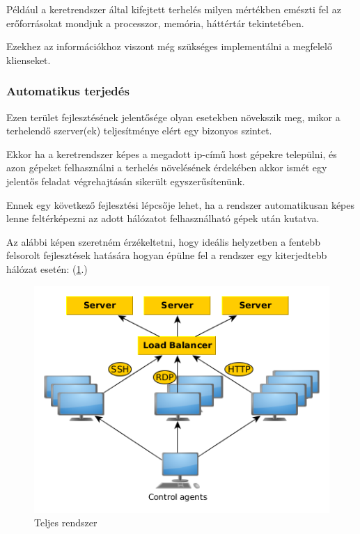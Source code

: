 \documentclass[a4paper,12pt,oneside]{report}
\begin{document}
Például a keretrendszer által kifejtett terhelés milyen mértékben emészti fel az erőforrásokat mondjuk a processzor, memória, háttértár tekintetében.

Ezekhez az információkhoz viszont még szükséges implementálni a megfelelő klienseket.

\subsubsection{Automatikus terjedés}

Ezen terület fejlesztésének jelentősége olyan esetekben növekszik meg, mikor a terhelendő szerver(ek) teljesítménye elért egy bizonyos szintet.

Ekkor ha a keretrendszer képes a megadott ip-című host gépekre települni, és azon gépeket felhasználni a terhelés növelésének érdekében akkor ismét egy jelentős feladat végrehajtásán sikerült egyszerűsítenünk.

Ennek egy következő fejlesztési lépcsője lehet, ha a rendszer automatikusan képes lenne feltérképezni az adott hálózatot felhasználható gépek után kutatva.

Az alábbi képen szeretném érzékeltetni, hogy ideális helyzetben a fentebb felsorolt fejlesztések hatására hogyan épülne fel a rendszer egy kiterjedtebb hálózat esetén: (\ref{fig:generator}.)

\begin{figure}[h]
      \includegraphics[width=13cm,keepaspectratio]{generator.png}
          \caption{Teljes rendszer}
      \label{fig:generator}
\end{figure}
\end{document}
